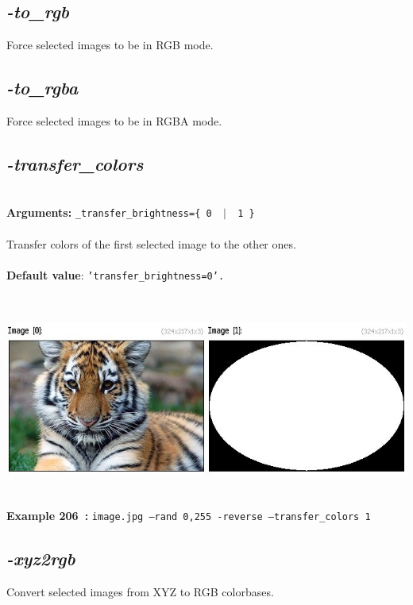 \documentclass[a4paper,11pt,twoside]{book}
\begin{document}
\subsection{\emph{-to\_rgb} }\vspace*{-0.5em}
Force selected images to be in RGB mode.


\subsection{\emph{-to\_rgba} }\vspace*{-0.5em}
Force selected images to be in RGBA mode.


\subsection{\emph{-transfer\_colors} }\vspace*{-0.5em}
~\\\textbf{Arguments: } 
{\small \texttt{\_transfer\_brightness=\{ 0 ~$|$~ 1 \}}}\\~\\
Transfer colors of the first selected image to the other ones.
~\\~\\\textbf{Default value}: {\small \texttt{'transfer\_brightness=0'.}}
\begin{center}\includegraphics[keepaspectratio=true,height=7cm,width=\textwidth]{img/gmic_def206.jpg}\\
{\footnotesize \textbf{Example 206~:} \texttt{image.jpg --rand 0,255 -reverse --transfer\_colors 1}}
\end{center}

\subsection{\emph{-xyz2rgb} }\vspace*{-0.5em}
Convert selected images from XYZ to RGB colorbases.
\end{document}

